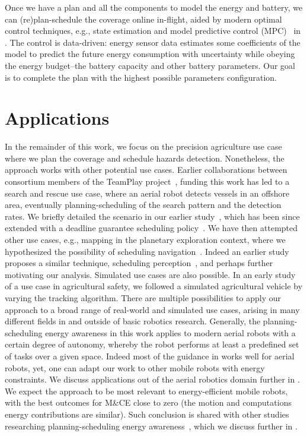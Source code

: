 Once we have a plan and all the components to model the energy and battery, we can (re)plan-schedule the coverage online in-flight, aided by modern optimal control techniques, e.g.,  state estimation and model predictive control (MPC)~\citep{rawlings2017model,simon2006optimal} in . The control is data-driven: energy sensor data estimates some coefficients of the model to predict the future energy consumption with uncertainty while obeying the energy budget--the battery capacity and other battery parameters. Our goal is to complete the plan with the highest possible parameters configuration.


\section{Applications}
\label{sec:applics}

In the remainder of this work, we focus on the precision agriculture use case where we plan the coverage and schedule hazards detection. Nonetheless, the approach works with other potential use cases. Earlier collaborations between consortium members of the TeamPlay project~\citep{teamplay}, funding this work has led to a search and rescue use case, where an aerial robot detects vessels in an offshore area, eventually planning-scheduling of the search pattern and the detection rates. We briefly detailed the scenario in our earlier study~\citep{seewald2019coarse}, which has been since extended with a deadline guarantee scheduling policy~\citep{rouxel2020prego}. We have then attempted other use cases, e.g., mapping in the planetary exploration context, where we hypothesized the possibility of scheduling navigation~\citep{seewald2020beyond}. Indeed an earlier study proposes a similar technique, scheduling perception~\citep{ondruska2015scheduled}, and perhaps further motivating our analysis. Simulated use cases are also possible. In an early study~\citep{zamanakos2020energy} of a use case in agricultural safety, we followed a simulated agricultural vehicle by varying the tracking algorithm. There are multiple possibilities to apply our approach to a broad range of real-world and simulated use cases, arising in many different fields in and outside of basic robotics research. Generally, the planning-scheduling energy awareness in this work applies to modern aerial robots with a certain degree of autonomy, whereby the robot performs at least a predefined set of tasks over a given space. Indeed most of the guidance in  works well for aerial robots, yet, one can adapt our work to other mobile robots with energy constraints. We discuss applications out of the aerial robotics domain further in . We expect the approach to be most relevant to energy-efficient mobile robots, with the best outcomes for M\&CE close to zero (the motion and computations energy contributions are similar). Such conclusion is shared with other studies researching planning-scheduling energy awareness~\citep{sudhakar2020balancing,ondruska2015scheduled,lahijanian2018resource,mei2005case,brateman2006energy}, which we discuss further in .


